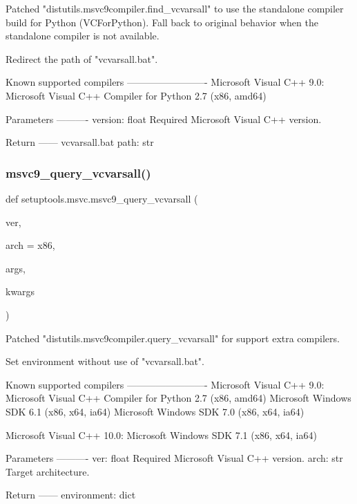 \begin{DoxyVerb}Patched "distutils.msvc9compiler.find_vcvarsall" to use the standalone
compiler build for Python (VCForPython). Fall back to original behavior
when the standalone compiler is not available.

Redirect the path of "vcvarsall.bat".

Known supported compilers
-------------------------
Microsoft Visual C++ 9.0:
    Microsoft Visual C++ Compiler for Python 2.7 (x86, amd64)

Parameters
----------
version: float
    Required Microsoft Visual C++ version.

Return
------
vcvarsall.bat path: str
\end{DoxyVerb}
 \mbox{\label{namespacesetuptools_1_1msvc_afdbaf4f7d94d7e19c621a4632d9a8027}} 
\subsubsection{\texorpdfstring{msvc9\+\_\+query\+\_\+vcvarsall()}{msvc9\_query\_vcvarsall()}}
{\footnotesize\ttfamily def setuptools.\+msvc.\+msvc9\+\_\+query\+\_\+vcvarsall (\begin{DoxyParamCaption}\item[{}]{ver,  }\item[{}]{arch = {\ttfamily \textquotesingle{}x86\textquotesingle{}},  }\item[{}]{args,  }\item[{}]{kwargs }\end{DoxyParamCaption})}

\begin{DoxyVerb}Patched "distutils.msvc9compiler.query_vcvarsall" for support extra
compilers.

Set environment without use of "vcvarsall.bat".

Known supported compilers
-------------------------
Microsoft Visual C++ 9.0:
    Microsoft Visual C++ Compiler for Python 2.7 (x86, amd64)
    Microsoft Windows SDK 6.1 (x86, x64, ia64)
    Microsoft Windows SDK 7.0 (x86, x64, ia64)

Microsoft Visual C++ 10.0:
    Microsoft Windows SDK 7.1 (x86, x64, ia64)

Parameters
----------
ver: float
    Required Microsoft Visual C++ version.
arch: str
    Target architecture.

Return
------
environment: dict
\end{DoxyVerb}
 